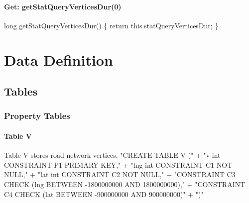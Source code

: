 \subsection{Get: getStatQueryVerticesDur(0)}
\nwenddocs{}\endmoddef{}
long getStatQueryVerticesDur() \{
  return this.statQueryVerticesDur;
\}
\eatline
{}\nwendcode{}\nwdocspar
\nwenddocs{}\part{Data Definition}
\label{data}

\chapter{Tables}
\label{tables}

\section{Property Tables}

\subsection{Table V}
Table V stores road network vertices.
\nwenddocs{}\endmoddef{}
"CREATE TABLE V ("
  + "v   int  CONSTRAINT P1 PRIMARY KEY,"
  + "lng int  CONSTRAINT C1 NOT NULL,"
  + "lat int  CONSTRAINT C2 NOT NULL,"
  + "CONSTRAINT C3 CHECK (lng BETWEEN -1800000000 AND 1800000000),"
  + "CONSTRAINT C4 CHECK (lat BETWEEN  -900000000 AND  900000000)"
  + ")"
\nwendcode{}\nwdocspar

